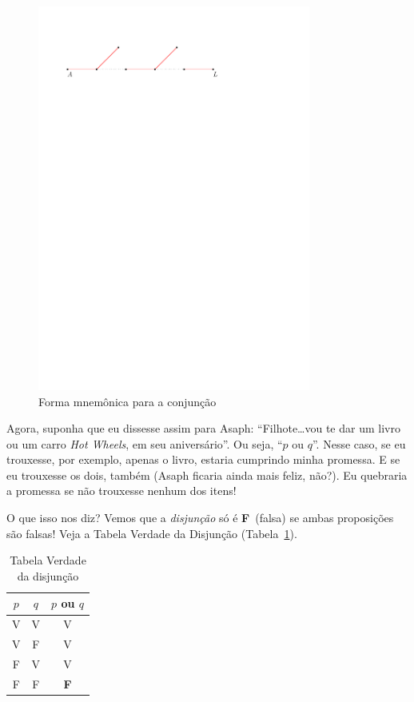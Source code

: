 \documentclass[12pt]{article}
\theoremstyle{definition}
\newcommand{\F}{\textbf{F}}
\begin{document}
\begin{figure}[!h]%
\centering
\includegraphics[width=0.8\textwidth]{circuito-em-serie}%
\caption{Forma mnemônica para a conjunção}%
\label{fig:circ-serie}%
\end{figure}

Agora, suponha que eu dissesse assim para Asaph: ``Filhote\ldots vou te dar um
livro ou um carro \textit{Hot Wheels}, em seu aniversário''.
Ou seja, ``$p$ ou $q$''.
Nesse caso, se eu trouxesse, por exemplo, apenas o livro, estaria cumprindo 
minha promessa.
E se eu trouxesse os dois, também (Asaph ficaria ainda mais feliz, não?).
Eu quebraria a promessa se não trouxesse nenhum dos itens!

O que isso nos diz?
Vemos que a \textit{disjunção} só é \F\ (falsa) se ambas proposições são falsas!
Veja a Tabela Verdade da Disjunção (Tabela~\ref{tab:disjuncao}).

\begin{table}[!htbp]%
\centering
\scalebox{0.8}
 {
  \begin{tabular}{ccc}
	  \toprule
    $p$ & $q$ & $p$ ou $q$\\
	  \midrule
    V   &  V  & V\\
	  	V   &  F  & V\\
	  	F   &  V  & V\\
	  	F   &  F  & \F\\
	  \bottomrule
  \end{tabular}
 }
\caption{Tabela Verdade da disjunção}
\label{tab:disjuncao}
\end{table}
\end{document}
